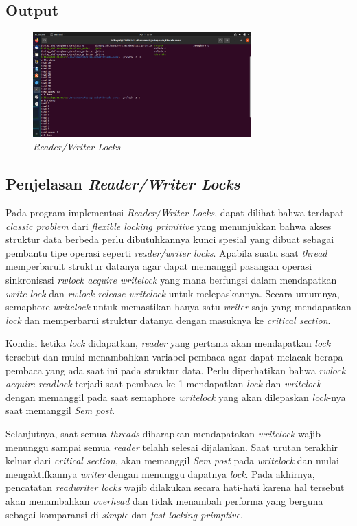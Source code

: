\documentclass[11pt,a4paper]{article}
\begin{document}
\subsection{Output}
\begin{figure}[h]
	\centering
	\includegraphics[width=0.75\textwidth]{Figure1/rwlock.png}
	\caption{\textit{Reader/Writer Locks}}
\end{figure}

\newpage
\subsection{Penjelasan \textit{Reader/Writer Locks}}
Pada program implementasi \textit{Reader/Writer Locks}, dapat dilihat bahwa terdapat \textit{classic problem} dari \textit{flexible locking primitive} yang menunjukkan bahwa 
akses struktur data berbeda perlu dibutuhkannya kunci spesial yang dibuat sebagai pembantu tipe operasi seperti \textit{reader/writer locks}. Apabila suatu saat \textit{thread} 
memperbaruit struktur datanya agar dapat memanggil pasangan operasi sinkronisasi \textit{rwlock acquire writelock} yang mana berfungsi dalam mendapatkan \textit{write lock} dan 
\textit{rwlock release writelock} untuk melepaskannya. Secara umumnya, semaphore \textit{writelock} untuk memastikan hanya satu \textit{writer} saja yang mendapatkan \textit{lock} dan 
memperbarui struktur datanya dengan masuknya ke \textit{critical section}. \par
Kondisi ketika \textit{lock} didapatkan, \textit{reader} yang pertama akan mendapatkan \textit{lock} tersebut dan mulai menambahkan variabel pembaca agar dapat melacak berapa pembaca yang 
ada saat ini pada struktur data. Perlu diperhatikan bahwa \textit{rwlock acquire readlock} terjadi saat pembaca ke-1 mendapatkan \textit{lock} dan \textit{writelock} dengan memanggil  
pada saat semaphore \textit{writelock} yang akan dilepaskan \textit{lock}-nya saat memanggil \textit{Sem post}. \par
Selanjutnya, saat semua \textit{threads} diharapkan mendapatakan \textit{writelock} wajib menunggu sampai semua \textit{reader} telahh selesai dijalankan. Saat urutan terakhir keluar dari \textit{critical section}, akan 
memanggil \textit{Sem post} pada \textit{writelock} dan mulai mengaktifkannya \textit{writer} dengan menunggu dapatnya \textit{lock}. Pada akhirnya, pencatatan \textit{readwriter locks} wajib dilakukan secara hati-hati karena 
hal tersebut akan menambahkan \textit{overhead} dan tidak menambah performa yang berguna sebagai komparansi di \textit{simple} dan \textit{fast locking primptive}.
\end{document}
